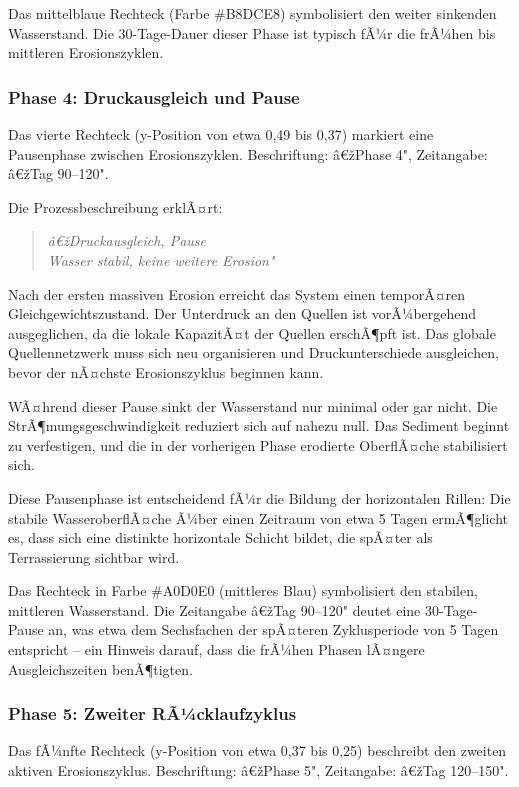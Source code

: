 Das mittelblaue Rechteck (Farbe \#B8DCE8) symbolisiert den weiter sinkenden Wasserstand. Die 30-Tage-Dauer dieser Phase ist typisch fÃ¼r die frÃ¼hen bis mittleren Erosionszyklen.

\subsubsection*{Phase 4: Druckausgleich und Pause}

Das vierte Rechteck (y-Position von etwa 0,49 bis 0,37) markiert eine Pausenphase zwischen Erosionszyklen. Beschriftung: â€žPhase 4", Zeitangabe: â€žTag 90--120".

Die Prozessbeschreibung erklÃ¤rt:
\begin{quote}
\textit{â€žDruckausgleich, Pause\\
Wasser stabil, keine weitere Erosion"}
\end{quote}

Nach der ersten massiven Erosion erreicht das System einen temporÃ¤ren Gleichgewichtszustand. Der Unterdruck an den Quellen ist vorÃ¼bergehend ausgeglichen, da die lokale KapazitÃ¤t der Quellen erschÃ¶pft ist. Das globale Quellennetzwerk muss sich neu organisieren und Druckunterschiede ausgleichen, bevor der nÃ¤chste Erosionszyklus beginnen kann.

WÃ¤hrend dieser Pause sinkt der Wasserstand nur minimal oder gar nicht. Die StrÃ¶mungsgeschwindigkeit reduziert sich auf nahezu null. Das Sediment beginnt zu verfestigen, und die in der vorherigen Phase erodierte OberflÃ¤che stabilisiert sich.

Diese Pausenphase ist entscheidend fÃ¼r die Bildung der horizontalen Rillen: Die stabile WasseroberflÃ¤che Ã¼ber einen Zeitraum von etwa 5 Tagen ermÃ¶glicht es, dass sich eine distinkte horizontale Schicht bildet, die spÃ¤ter als Terrassierung sichtbar wird.

Das Rechteck in Farbe \#A0D0E0 (mittleres Blau) symbolisiert den stabilen, mittleren Wasserstand. Die Zeitangabe â€žTag 90--120" deutet eine 30-Tage-Pause an, was etwa dem Sechsfachen der spÃ¤teren Zyklusperiode von 5 Tagen entspricht -- ein Hinweis darauf, dass die frÃ¼hen Phasen lÃ¤ngere Ausgleichszeiten benÃ¶tigten.

\subsubsection*{Phase 5: Zweiter RÃ¼cklaufzyklus}

Das fÃ¼nfte Rechteck (y-Position von etwa 0,37 bis 0,25) beschreibt den zweiten aktiven Erosionszyklus. Beschriftung: â€žPhase 5", Zeitangabe: â€žTag 120--150".

